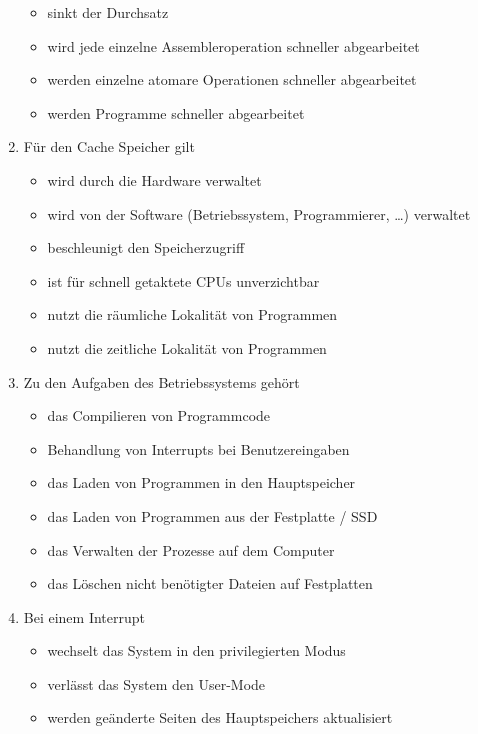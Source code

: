 \documentclass{exercisesheet}
\begin{document}
\begin{enumerate}
\begin{itemize}
          \item sinkt der Durchsatz
          \item wird jede einzelne Assembleroperation schneller abgearbeitet
          \item werden einzelne atomare Operationen schneller abgearbeitet
          \item werden Programme schneller abgearbeitet \checkmark
        \end{itemize}
  \item Für den Cache Speicher gilt
        \begin{itemize}
          \item wird durch die Hardware verwaltet \checkmark
          \item wird von der Software (Betriebssystem, Programmierer, …) verwaltet
          \item beschleunigt den Speicherzugriff
          \item ist für schnell getaktete CPUs unverzichtbar \checkmark
          \item nutzt die räumliche Lokalität von Programmen \checkmark
          \item nutzt die zeitliche Lokalität von Programmen \checkmark
        \end{itemize}
  \item Zu den Aufgaben des Betriebssystems gehört
        \begin{itemize}
          \item das Compilieren von Programmcode
          \item Behandlung von Interrupts bei Benutzereingaben
          \item das Laden von Programmen in den Hauptspeicher \checkmark
          \item das Laden von Programmen aus der Festplatte / SSD
          \item das Verwalten der Prozesse auf dem Computer \checkmark
          \item das Löschen nicht benötigter Dateien auf Festplatten
        \end{itemize}
  \item Bei einem Interrupt
        \begin{itemize}
          \item wechselt das System in den privilegierten Modus \checkmark
          \item verlässt das System den User-Mode
          \item werden geänderte Seiten des Hauptspeichers aktualisiert

\end{itemize}
\end{enumerate}
\end{document}
